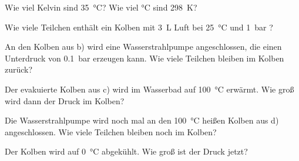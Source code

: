 \documentclass[ahaeffekt]{exercise}
\begin{document}
\begin{alphlist}
 \item Wie viel Kelvin sind \SI{35}{\celsius}? Wie viel \si{\celsius} sind \SI{298}{\kelvin}?
 \item Wie viele Teilchen enthält ein Kolben mit \SI{3}{\liter} Luft bei \SI{25}{\celsius} und \SI{1}{\bar} ?
 \item An den Kolben aus b) wird eine Wasserstrahlpumpe angeschlossen, die einen Unterdruck von \SI{0.1}{\bar} erzeugen kann. Wie viele Teilchen bleiben im Kolben zurück?
 \item Der evakuierte Kolben aus c) wird im Wasserbad auf \SI{100}{\celsius} erwärmt. Wie groß wird dann der Druck im Kolben?
 \item Die Wasserstrahlpumpe wird noch mal an den \SI{100}{\celsius} heißen Kolben aus d) angeschlossen. Wie viele Teilchen bleiben noch im Kolben?
 \item Der Kolben wird auf \SI{0}{\celsius} abgekühlt. Wie groß ist der Druck jetzt?
\end{alphlist}
\end{document}
